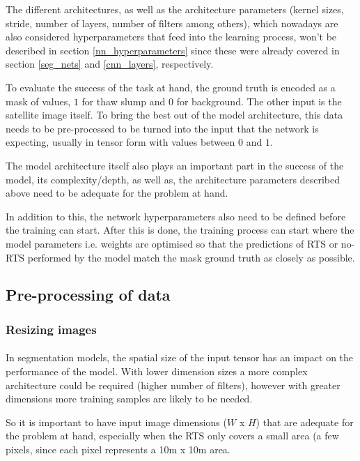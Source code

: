 The different architectures, as well as the architecture parameters (kernel sizes, stride, number of layers, number of filters among others), which nowadays are also considered hyperparameters that feed into the learning process, won't be described in section \ref{nn_hyperparameters} since these were already covered in section \ref{seg_nets} and \ref{cnn_layers}, respectively.

To evaluate the success of the task at hand, the ground truth is encoded as a mask of values, $1$ for thaw slump and $0$ for background. The other input is the satellite image itself. To bring the best out of the model architecture, this data needs to be pre-processed to be turned into the input that the network is expecting, usually in tensor form with values between $0$ and $1$.

The model architecture itself also plays an important part in the success of the model, its complexity/depth, as well as, the architecture parameters described above need to be adequate for the problem at hand.

In addition to this, the network hyperparameters also need to be defined before the training can start. After this is done, the training process can start where the model parameters \gls{i.e.} weights are optimised so that the predictions of \gls{RTS} or no-\gls{RTS} performed by the model match the mask ground truth as closely as possible.

\subsection{Pre-processing of data} \label{data_preproc}
\subsubsection{Resizing images} \label{img_resize}
\paragraph{}
In segmentation models, the spatial size of the input tensor has an impact on the performance of the model. With lower dimension sizes a more complex architecture could be required (higher number of filters), however with greater dimensions more training samples are likely to be needed.

So it is important to have input image dimensions ($W$ x $H$) that are adequate for the problem at hand, especially when the \gls{RTS} only covers a small area (a few pixels, since each pixel represents a 10m x 10m area.

